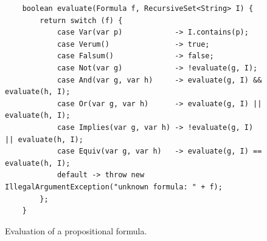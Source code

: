 \begin{figure}[!ht]
  \centering
\begin{verbatim}
    boolean evaluate(Formula f, RecursiveSet<String> I) {
        return switch (f) {
            case Var(var p)            -> I.contains(p);
            case Verum()               -> true;
            case Falsum()              -> false;
            case Not(var g)            -> !evaluate(g, I);
            case And(var g, var h)     -> evaluate(g, I) && evaluate(h, I);
            case Or(var g, var h)      -> evaluate(g, I) || evaluate(h, I);
            case Implies(var g, var h) -> !evaluate(g, I) || evaluate(h, I);
            case Equiv(var g, var h)   -> evaluate(g, I) == evaluate(h, I);
            default -> throw new IllegalArgumentException("unknown formula: " + f);
        };
    }
\end{verbatim}
\vspace*{-0.3cm}
  \caption{Evaluation of a propositional formula.}
  \label{fig:evaluate.py}
\end{figure} 

